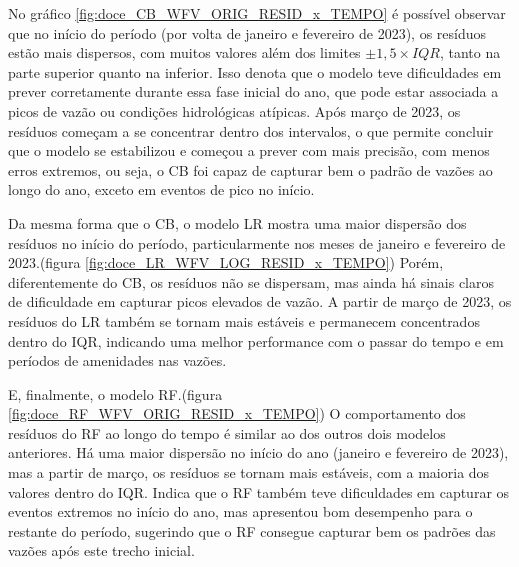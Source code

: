 %
%

No gráfico \ref{fig:doce_CB_WFV_ORIG_RESID_x_TEMPO} é possível observar que no início do período (por volta de janeiro e fevereiro de 2023), os resíduos estão mais dispersos, com muitos valores além dos limites $\pm 1,5 \times IQR$, tanto na parte superior quanto na inferior. Isso denota que o modelo teve dificuldades em prever corretamente durante essa fase inicial do ano, que pode estar associada a picos de vazão ou condições hidrológicas atípicas. Após março de 2023, os resíduos começam a se concentrar dentro dos intervalos, o que permite concluir que o modelo se estabilizou e começou a prever com mais precisão, com menos erros extremos, ou seja, o CB foi capaz de capturar bem o padrão de vazões ao longo do ano, exceto em eventos de pico no início.

Da mesma forma que o CB, o modelo LR mostra uma maior dispersão dos resíduos no início do período, particularmente nos meses de janeiro e fevereiro de 2023.(figura \ref{fig:doce_LR_WFV_LOG_RESID_x_TEMPO}) Porém, diferentemente do CB, os resíduos não se dispersam, mas ainda há sinais claros de dificuldade em capturar picos elevados de vazão. A partir de março de 2023, os resíduos do LR também se tornam mais estáveis e permanecem concentrados dentro do IQR, indicando uma melhor performance com o passar do tempo e em períodos de amenidades nas vazões.

E, finalmente, o modelo RF.(figura \ref{fig:doce_RF_WFV_ORIG_RESID_x_TEMPO}) O comportamento dos resíduos do RF ao longo do tempo é similar ao dos outros dois modelos anteriores. Há uma maior dispersão no início do ano (janeiro e fevereiro de 2023), mas a partir de março, os resíduos se tornam mais estáveis, com a maioria dos valores dentro do IQR. Indica que o RF também teve dificuldades em capturar os eventos extremos no início do ano, mas apresentou bom desempenho para o restante do período, sugerindo que o RF consegue capturar bem os padrões das vazões após este trecho inicial.

